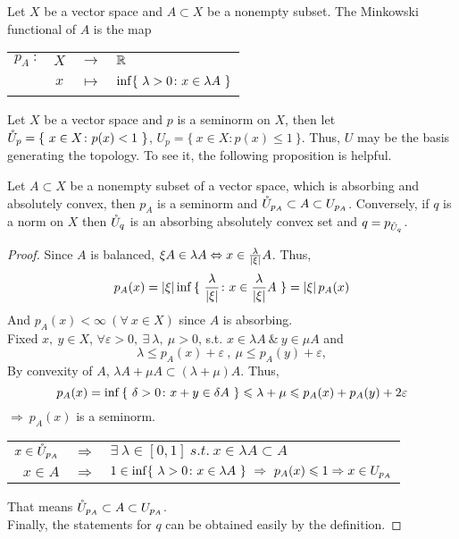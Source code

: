 \documentclass[a4paper,11pt]{report}
\begin{document}
\begin{defn}
	Let $X$ be a vector space and $A \subset X$ be a nonempty subset. The Minkowski functional of $A$ is the map
	\begin{center}
		\begin{tabular}{l c c l}
			$p_A ~ \colon$ & $X$ & $\longrightarrow$ & $\mathbb{R}$ \\
			~ & $x$ & $\mapsto$ & $\operatorname{inf}\{~ \lambda > 0 \colon x \in \lambda A ~\}$
		\end{tabular}
	\end{center}
\end{defn}

Let $X$ be a vector space and $p$ is a seminorm on $X$, then let $\mathring{U}_p = \{~ x \in X \colon p(x) < 1 ~\}$, $U_p = \{~ x \in X \colon p(x) \leqslant 1 ~\}$. Thus, $U$ may be the basis generating the topology. To see it, the following proposition is helpful.

\begin{prop}
	Let $A \subset X$ be a nonempty subset of a vector space, which is absorbing and absolutely convex, then $p_A$ is a seminorm and $\mathring{U}_{p_A} \subset A \subset U_{p_A}$. Conversely, if $q$ is a norm on $X$ then $\mathring{U}_q$ is an absorbing absolutely convex set and $q = p_{\mathring{U}_q}$.
\end{prop}
\begin{proof}
	Since $A$ is balanced, $\xi A \in \lambda A \Leftrightarrow x \in \frac{\lambda}{\left\lvert\xi\right\lvert} A$. Thus,
	\begin{equation*}
		p_A(x) = \left\lvert\xi\right\lvert \operatorname{inf}{\{~ \frac{\lambda}{\left\lvert\xi\right\lvert} \colon x \in \frac{\lambda}{\left\lvert\xi\right\lvert} A~\}} = \left\lvert\xi\right\lvert p_A(x)
	\end{equation*}
	And $p_A(x) < \infty  ~( \forall ~ x \in X)$ since $A$ is absorbing.\\
	Fixed $x,~ y \in X$, $\forall \varepsilon > 0,~ \exists ~ \lambda,~ \mu > 0$, s.t. $x \in \lambda A ~\&~ y \in \mu A$ and
	\begin{equation*}
		\lambda \leqslant p_A(x) + \varepsilon ~,~ \mu \leqslant p_A(y) + \varepsilon,
	\end{equation*}
	By convexity of $A$, $\lambda A + \mu A \subset (\lambda + \mu) A$. Thus,
	\begin{equation*}
		p_A(x) = \operatorname{inf}{\{~ \delta > 0 \colon x+y \in \delta A ~\}} \leqslant \lambda + \mu \leqslant p_A(x) + p_A(y) + 2\varepsilon
	\end{equation*}
	$\Rightarrow ~ p_A(x)$ is a seminorm.
	\begin{center}
		\begin{tabular}{r c l}
			$x \in \mathring{U}_{p_A}$ & $\Rightarrow$ & $\exists ~ \lambda \in [0,1] ~s.t.~ x \in \lambda A \subset A$ \\
			$x \in A$ &  $\Rightarrow$  & $1 \in \operatorname{inf}\{~ \lambda > 0 \colon x \in \lambda A ~\} ~ \Rightarrow ~ p_A(x) \leqslant 1 \Rightarrow x \in U_{p_A}$
		\end{tabular}
	\end{center}
	That means $\mathring{U}_{p_A} \subset A \subset U_{p_A}$.\\
	Finally, the statements for $q$ can be obtained easily by the definition.
\end{proof}
\end{document}
